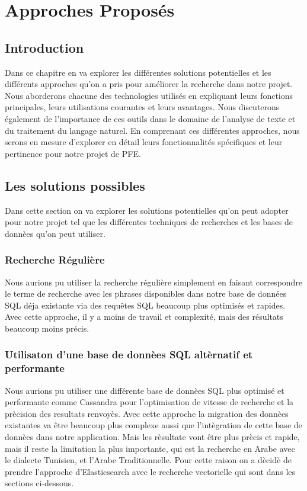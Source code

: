 \chapter{Approches Proposés}
\localtableofcontents

\newpage
\section{Introduction}
\noindent
Dans ce chapitre en va explorer les différentes solutions potentielles et les différents approches qu'on a pris pour améliorer la recherche dans notre projet. Nous aborderons chacune des technologies utilisés en expliquant leurs fonctions principales, leurs utilisations courantes et leurs avantages. Nous discuterons également de l'importance de ces outils dans le domaine de l'analyse de texte et du traitement du langage naturel. En comprenant ces différentes approches, nous serons en mesure d'explorer en détail leurs fonctionnalités spécifiques et leur pertinence pour notre projet de PFE.

\section{Les solutions possibles}
\noindent
Dans cette section on va explorer les solutions potentielles qu'on peut adopter pour notre projet tel que les différentes techniques de recherches et les bases de donnèes qu'on peut utiliser. 

\subsection{Recherche Régulière}
\noindent
Nous aurions pu utiliser la recherche régulière simplement en faisant correspondre le terme de recherche avec les phrases disponibles dans notre base de données SQL déja existante via des requêtes SQL beaucoup plus optimisés et rapides. Avec cette approche, il y a moins de travail et complexité, mais des résultats beaucoup moins précis.

\subsection{Utilisaton d'une base de donnèes SQL altèrnatif et performante}
\noindent
Nous aurions pu utiliser une différente base de donnèes SQL plus optimisé et performante comme Cassandra pour l'optimisation de vitesse de recherche et la prècision des resultats renvoyès. Avec cette approche la migration des donnèes existantes va être beaucoup plus complexe aussi que l'intègration de cette base de donnèes dans notre application. Mais les rèsultate vont être plus prècis et rapide, mais il reste la limitation la plus importante, qui est la recherche en Arabe avec le dialecte Tunisien, et l'Arabe Traditionnelle. Pour cette raison on a dècidè de prendre l'approche d'Elasticsearch avec le recherche vectorielle qui sont dans les sections ci-dessous.

